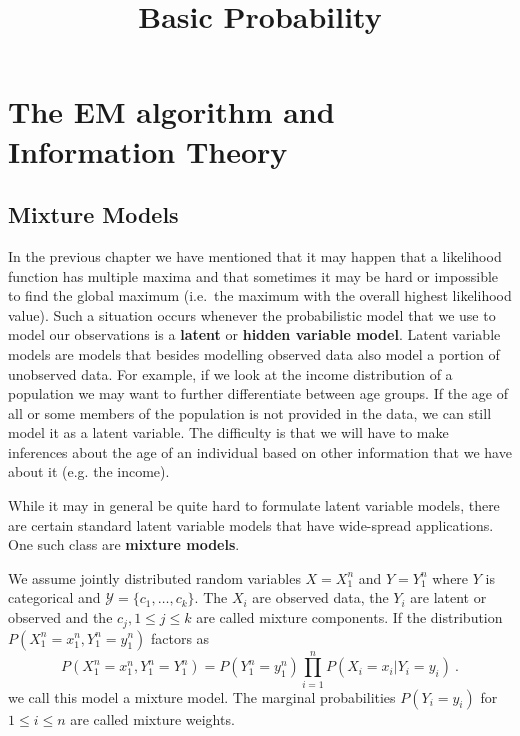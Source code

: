 \documentclass[a4paper,11pt,leqno]{report}\usepackage[]{graphicx}\usepackage[]{color}
\title{Basic Probability}
\date{}
\begin{document}
\setcounter{chapter}{5}

\chapter{The EM algorithm and Information Theory}

\section{Mixture Models}\label{sec:mixtureModels}

In the previous chapter we have mentioned that it may happen that a likelihood function has multiple 
maxima and that sometimes it may be hard or impossible to find the global maximum (i.e.\ the maximum
with the overall highest likelihood value). Such a situation occurs whenever the probabilistic model
that we use to model our observations is a \textbf{latent} or \textbf{hidden variable model}. Latent variable
models are models that besides modelling observed data also model a portion of unobserved data. For
example, if we look at the income distribution of a population we may want to further differentiate
between age groups. If the age of all or some members of the population is not provided in the data, we
can still model it as a latent variable. The difficulty is that we will have to make inferences about the
age of an individual based on other information that we have about it (e.g. the income). 

While it may in general be quite hard to formulate latent variable models, there are certain standard
latent variable models that have wide-spread applications. One such class are \textbf{mixture models}.

\begin{Definition}\label{def:mixtureModel}
We assume jointly distributed random variables $ X=X_{1}^{n} $ and $ Y=Y_{1}^{n} $ where $ Y $ is categorical and
$ \mathcal{Y} = \{c_{1}, \ldots, c_{k}\} $. The $ X_{i} $ are observed data, the $ Y_{i} $ are latent
or observed and the $ c_{j}, 1\leq j \leq k $ are called mixture components. 
If the distribution
$ P(X_{1}^{n}=x_{1}^{n}, Y_{1}^{n} = y_{1}^{n}) $ factors as
$$ P(X_{1}^{n}=x_{1}^{n}, Y_{1}^{n} = Y_{1}^{n})= P(Y_{1}^{n} = y_{1}^{n}) \prod_{i=1}^{n} P(X_{i}=x_{i}|Y_{i} = y_{i}) \ . $$
we call this model a mixture model. The marginal probabilities $ P(Y_{i}=y_{i}) $ for $ 1 \leq i \leq n $ are called
mixture weights.
\end{Definition}
\end{document}

